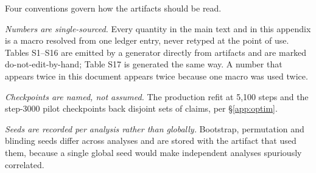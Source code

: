 \documentclass{article}
\begin{document}
Four conventions govern how the artifacts should be read.

\emph{Numbers are single-sourced.} Every quantity in the main text and in this appendix is a macro
resolved from one ledger entry, never retyped at the point of use. Tables S1--S16 are emitted by a
generator directly from artifacts and are marked do-not-edit-by-hand; Table S17 is generated the same
way. A number that appears twice in this document appears twice because one macro was used twice.

\emph{Checkpoints are named, not assumed.} The production refit at 5,100 steps and the step-3000
pilot checkpoints back disjoint sets of claims, per \S\ref{app:optim}.

\emph{Seeds are recorded per analysis rather than globally.} Bootstrap, permutation and blinding seeds
differ across analyses and are stored with the artifact that used them, because a single global seed
would make independent analyses spuriously correlated.
\end{document}
